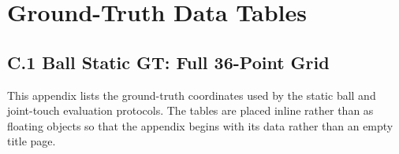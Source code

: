 \cleardoublepage
{}
\chapter{Ground-Truth Data Tables}

\section*{C.1 Ball Static GT: Full 36-Point Grid}

This appendix lists the ground-truth coordinates used by the static ball and joint-touch evaluation protocols. The tables are placed inline rather than as floating objects so that the appendix begins with its data rather than an empty title page.

\begingroup
\singlespacing
\small
\setlength{\LTleft}{\fill}
\setlength{\LTright}{\fill}
\setlength{\tabcolsep}{5pt}
\renewcommand{\arraystretch}{0.92}
